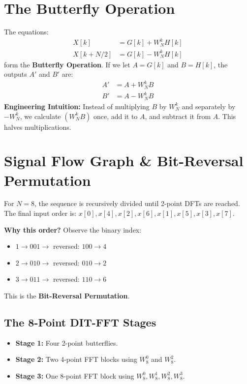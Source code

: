 \documentclass[11pt,a4paper]{article}
\begin{document}
\section{The Butterfly Operation}
The equations:
\begin{align}
X[k] &= G[k] + W_N^k H[k] \\
X[k+N/2] &= G[k] - W_N^k H[k]
\end{align}
form the \textbf{Butterfly Operation}. If we let $A = G[k]$ and $B = H[k]$, the outputs $A'$ and $B'$ are:
\begin{align}
A' &= A + W_N^k B \\
B' &= A - W_N^k B
\end{align}
\textbf{Engineering Intuition:} Instead of multiplying $B$ by $W_N^k$ and separately by $-W_N^k$, we calculate $(W_N^k B)$ once, add it to $A$, and subtract it from $A$. This halves multiplications.

\section{Signal Flow Graph \& Bit-Reversal Permutation}
For $N=8$, the sequence is recursively divided until 2-point DFTs are reached. The final input order is: $x[0], x[4], x[2], x[6], x[1], x[5], x[3], x[7]$.

\textbf{Why this order?} Observe the binary index:
\begin{itemize}
    \item $1 \rightarrow 001 \rightarrow$ reversed: $100 \rightarrow 4$
    \item $2 \rightarrow 010 \rightarrow$ reversed: $010 \rightarrow 2$
    \item $3 \rightarrow 011 \rightarrow$ reversed: $110 \rightarrow 6$
\end{itemize}
This is the \textbf{Bit-Reversal Permutation}.

\subsection{The 8-Point DIT-FFT Stages}
\begin{itemize}
    \item \textbf{Stage 1:} Four 2-point butterflies.
    \item \textbf{Stage 2:} Two 4-point FFT blocks using $W_8^0$ and $W_8^2$.
    \item \textbf{Stage 3:} One 8-point FFT block using $W_8^0, W_8^1, W_8^2, W_8^3$.
\end{itemize}
\end{document}
